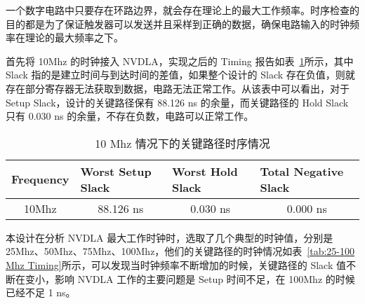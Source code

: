 一个数字电路中只要存在环路边界，就会存在理论上的最大工作频率。时序检查的目的都是为了保证触发器可以发送并且采样到正确的数据，确保电路输入的时钟频率在理论的最大频率之下。

首先将 10Mhz 的时钟接入 NVDLA，实现之后的 Timing 报告如表~\ref{tab:10Mhz Timing}所示，其中 Slack 指的是建立时间与到达时间的差值，如果整个设计的 Slack 存在负值，则就存在部分寄存器无法获取到数据，电路无法正常工作。从该表中可以看出，对于 Setup Slack，设计的关键路径保有 88.126 ns 的余量，而关键路径的 Hold Slack 只有 0.030 ns 的余量，不存在负数，电路可以正常工作。

\begin{table}[!htbp]
    \caption{10 Mhz 情况下的关键路径时序情况}
    \label{tab:10Mhz Timing}
    \centering
    \footnotesize%
    \setlength{\tabcolsep}{4pt}%
    \renewcommand{\arraystretch}{1.2}%
    \begin{tabular}{llll}
        \toprule
        \textbf{Frequency}        & \textbf{Worst Setup Slack}    & \textbf{Worst Hold Slack}    & \textbf{Total Negative Slack} \\
        \midrule
        \multicolumn{1}{c}{10Mhz} & \multicolumn{1}{c}{88.126 ns} & \multicolumn{1}{c}{0.030 ns} & \multicolumn{1}{c}{0.000 ns} \\
        \bottomrule                   
    \end{tabular}
\end{table}

本设计在分析 NVDLA 最大工作时钟时，选取了几个典型的时钟值，分别是 25Mhz、50Mhz、75Mhz、100Mhz，他们的关键路径的时钟情况如表~\ref{tab:25-100 Mhz Timing}所示，可以发现当时钟频率不断增加的时候，关键路径的 Slack 值不断在变小，影响 NVDLA 工作的主要问题是 Setup 时间不足，在 100Mhz 的时候已经不足 1 ns。

